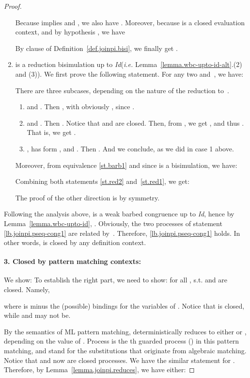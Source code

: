 \documentclass{LMCS}
\makeatletter
\newcommand{\ie}{\emph{i.e.}\@\xspace}
\newcommand{\Id}{\emph{Id}\@\xspace}
\renewcommand{\_}{\mathord{\rule[-.25ex]{1ex}{.15ex}}}
\makeatother
\begin{document}
\begin{proof}
\begin{enumerate}[]
    Because  implies  and , we also have .
    Moreover, because  is a closed evaluation context,
    and by hypothesis , we have
    
    By clause  of Definition~\ref{def.joinpi.bisi}, we finally get
    .

  \item  is a reduction bisimulation up to \Id (\ie
    Lemma~\ref{lemma.wbc-upto-id-alt}.(2) and (3)).  We first prove
    the following statement.  For any two  and~, we
    have:
        
    There are three subcases, depending on the nature of the reduction
    to~. 
\begin{enumerate}[(1)]
    \item  and . Then
    , with obviously ,
    since .

    \item  and
    . Then .
    Notice that  and  are
    closed. Then, from , we get ,
    and thus  .  That is, we get .

    \item ,  has
    form , and . Then . And we conclude,
     as we did in case 1 above.
\end{enumerate}\medskip

Moreover, from equivalence \eqref{st.barb1}
and since  is a bisimulation, we have:
    
    Combining both statements \eqref{st.red2} and~\eqref{st.red1},
    we get:
    
    The proof of the other direction is by symmetry.
  \end{enumerate}

  Following the analysis above,  is a weak barbed congruence up to
  \Id, hence by Lemma~\ref{lemma.wbc-upto-id}, .
  Obviously, the two processes of statement
  \eqref{lb.joinpi.pseq-cong1} are related by~. Therefore,
  \eqref{lb.joinpi.pseq-cong1} holds.  In other words,  is
  closed by any definition context.

  \paragraph{\bf 3. Closed by pattern matching contexts: }
  We show: 
  To establish the right part, we need to show: 
  for all , s.t.  and 
  are closed. Namely,
  
  where  is  minus the (possible) bindings for the
  variables of . Notice that  is closed, while
   and  may not be.

  By the semantics of ML pattern matching,  deterministically reduces to either
   or , depending
  on the value of .  Process  is the th
  guarded process () in this pattern matching,  and
   stand for the substitutions that originate from algebraic
  matching.  Notice that  and
   now are closed processes.  We have the similar
  statement for .  Therefore, by
  Lemma~\ref{lemma.joinpi.reduces}, we have either:
  

\end{proof}
\end{document}
